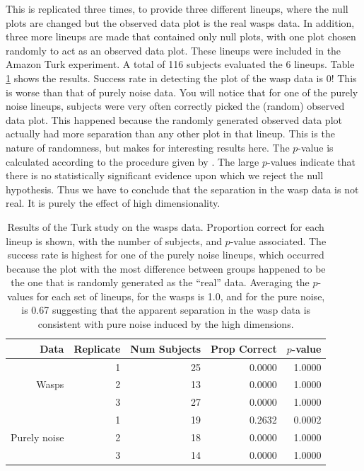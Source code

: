 This is replicated three times, to provide three different lineups, where the null plots are changed but the observed data plot is the real wasps data. In addition, three more lineups are made that contained only null plots, with one plot chosen randomly to act as an observed data plot. These lineups were included in the Amazon Turk experiment.  A total of 116 subjects evaluated the 6 lineups. Table \ref{wasp} shows the results. Success rate in detecting the plot of the wasp data is 0! This is worse than that of purely noise data. You will notice that for one of the purely noise lineups, subjects were very often correctly picked the (random) observed data plot. This happened because the randomly generated observed data plot actually had more separation than any other plot in that lineup. This is the nature of randomness, but makes for interesting results here. The $p$-value is calculated according to the procedure given by \cite{majumder:2011}. The large $p$-values indicate that there is no statistically significant evidence upon which we reject the null hypothesis. Thus we have to conclude that the separation in the wasp data is not real. It is purely the effect of high dimensionality. 

\begin{table}[ht]
\begin{center}
\caption{Results of the Turk study on the wasps data. Proportion correct for each lineup is shown, with the number of subjects, and $p$-value associated. The success rate is highest for one of the purely noise lineups, which occurred because the plot with the most difference between groups happened to be the one that is randomly generated as the ``real'' data. Averaging the $p$-values for each set of lineups, for the wasps is 1.0, and for the pure noise, is 0.67 suggesting that the apparent separation in the wasp data is consistent with pure noise induced by the high dimensions.}
\vspace{0.15cm}
\begin{tabular}{r|r|r|rr}
\hline
  \hline
 Data & Replicate & Num Subjects & Prop Correct & $p$-value\\ 
  \hline
  & 1 & 25 & 0.0000 &  1.0000\\
Wasps & 2 & 13 & 0.0000 &  1.0000\\ 
 & 3 & 27 & 0.0000 &  1.0000\\
 \hline
 & 1 & 19 & 0.2632 &  0.0002\\
Purely noise & 2 & 18 & 0.0000 &  1.0000 \\ 
 & 3 & 14 & 0.0000 &  1.0000\\
   \hline
\end{tabular}
\label{wasp}
\end{center}
\end{table}

